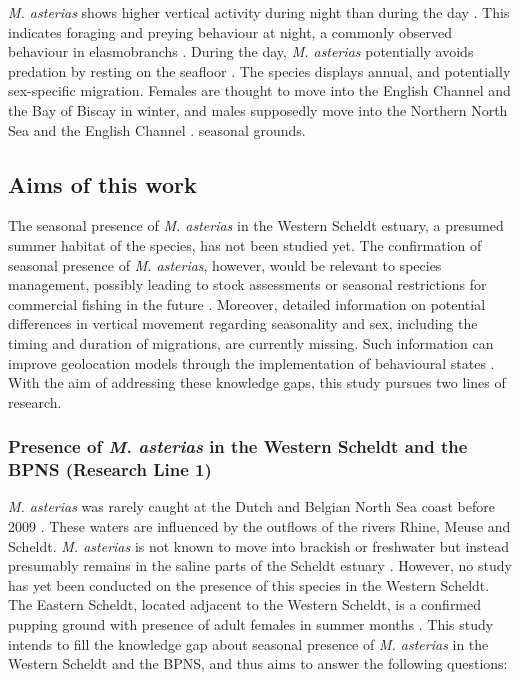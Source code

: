 \documentclass[
  authoryear,
  review,
  3p]{elsarticle}
\begin{document}
\emph{M. asterias} shows higher vertical activity during night than
during the day \citep{griffiths_2020}. This indicates foraging and
preying behaviour at night, a commonly observed behaviour in
elasmobranchs \citep{sims_2006}. During the day, \emph{M. asterias}
potentially avoids predation by resting on the seafloor
\citep{griffiths_2020}. The species displays annual, and potentially
sex-specific migration. Females are thought to move into the English
Channel and the Bay of Biscay in winter, and males supposedly move into
the Northern North Sea and the English Channel
\citep{breve_2016, breve_2020, griffiths_2020}. seasonal grounds.

\hypertarget{sec-intro-aims}{%
\subsection{Aims of this work}\label{sec-intro-aims}}

The seasonal presence of \emph{M. asterias} in the Western Scheldt
estuary, a presumed summer habitat of the species, has not been studied
yet. The confirmation of seasonal presence of \emph{M. asterias},
however, would be relevant to species management, possibly leading to
stock assessments or seasonal restrictions for commercial fishing in the
future \citep{benot_2003}. Moreover, detailed information on potential
differences in vertical movement regarding seasonality and sex,
including the timing and duration of migrations, are currently missing.
Such information can improve geolocation models through the
implementation of behavioural states \citep{pedersen_2008}. With the aim
of addressing these knowledge gaps, this study pursues two lines of
research.

\hypertarget{presence-of-m.-asterias-in-the-western-scheldt-and-the-bpns-research-line-1}{%
\subsubsection*{\texorpdfstring{Presence of \emph{M. asterias} in the
Western Scheldt and the BPNS (Research Line
1)}{Presence of M. asterias in the Western Scheldt and the BPNS (Research Line 1)}}\label{presence-of-m.-asterias-in-the-western-scheldt-and-the-bpns-research-line-1}}

\emph{M. asterias} was rarely caught at the Dutch and Belgian North Sea
coast before 2009 \citep{breve_2016}. These waters are influenced by the
outflows of the rivers Rhine, Meuse and Scheldt. \emph{M. asterias} is
not known to move into brackish or freshwater but instead presumably
remains in the saline parts of the Scheldt estuary
\citep{dewysiecki_2017}. However, no study has yet been conducted on the
presence of this species in the Western Scheldt. The Eastern Scheldt,
located adjacent to the Western Scheldt, is a confirmed pupping ground
with presence of adult females in summer months
\citep{breve_2016, breve_2020}. This study intends to fill the knowledge
gap about seasonal presence of \emph{M. asterias} in the Western Scheldt
and the BPNS, and thus aims to answer the following questions:
\end{document}

